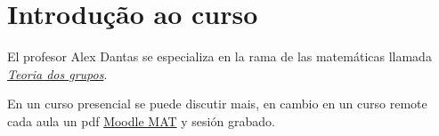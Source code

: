 \chapter*{Introdução ao curso}

El profesor Alex Dantas se especializa en la rama de las matemáticas
llamada \href{https://pt.wikipedia.org/wiki/Teoria_dos_grupos}{
  \emph{Teoria dos grupos}}.

En un curso presencial se puede discutir mais, en cambio en un curso remote cada aula un pdf \href{https://moodle.mat.unb.br/20201}{
  Moodle MAT} y sesión grabado.

\vfill
\nocite{*}
\printbibliography[
  title={\textcolor{DarkBlue}{Referências bibliográficas}{\fontspec[Renderer=Harfbuzz]{NotoColorEmoji.ttf}📚}},
  heading=bibintoc
]